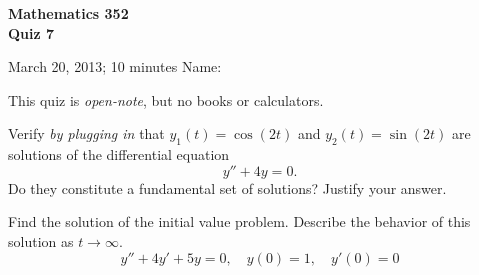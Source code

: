 \documentclass[11pt]{exam}
\begin{document}
\noindent
\textbf{{\large Mathematics 352 \\ Quiz 7}}

\noindent
March 20, 2013; 10 minutes  \hfill Name: \underline{\hspace{3in}} 

\noindent
This quiz is \emph{open-note}, but no books or calculators.

\begin{questions}  

\question Verify \emph{by plugging in} that $y_1(t) = \cos{(2t)}$ and $y_2(t) = \sin{(2t)}$ are solutions of the differential equation 
$$y'' + 4y = 0.$$ 
Do they constitute a fundamental set of solutions? Justify your answer.


\question Find the solution of the initial value problem. Describe the behavior of this solution as $t \to \infty$.
\[
    y'' + 4y' + 5y = 0, \quad y(0) = 1, \quad y'(0) = 0
\]


\end{questions}
\end{document}
